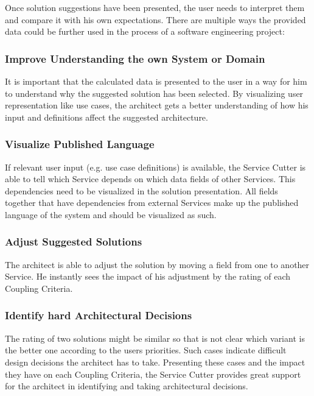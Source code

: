 Once solution suggestions have been presented, the user needs to interpret them and compare it with his own expectations. There are multiple ways the provided data could be further used in the process of a software engineering project:

\subsubsection{Improve Understanding the own System or Domain}

It is important that the calculated data is presented to the user in a way for him to understand why the suggested solution has been selected. By visualizing user representation like use cases, the architect gets a better understanding of how his input and definitions affect the suggested architecture. 

\subsubsection{Visualize Published Language}

If relevant user input (e.g. use case definitions) is available, the Service Cutter is able to tell which Service depends on which data fields of other Services. This dependencies need to be visualized in the solution presentation. All fields together that have dependencies from external Services make up the published language of the system and should be visualized as such.

\subsubsection{Adjust Suggested Solutions}

The architect is able to adjust the solution by moving a field from one to another Service. He instantly sees the impact of his adjustment by the rating of each Coupling Criteria.

\subsubsection{Identify hard Architectural Decisions}

The rating of two solutions might be similar so that is not clear which variant is the better one according to the users priorities. Such cases indicate difficult design decisions the architect has to take. Presenting these cases and the impact they have on each Coupling Criteria, the Service Cutter provides great support for the architect in identifying and taking architectural decisions.

